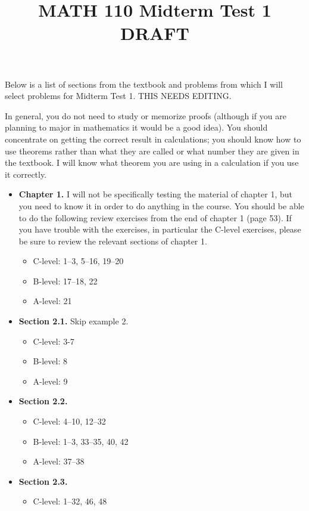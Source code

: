 \documentclass[11pt]{article}
\title{MATH 110 Midterm Test 1 DRAFT}
\author{\commonAuthor}
\date{\commonDateMTOne}
\begin{document}
\maketitle

Below is a list of sections from the textbook
and problems from which I will select problems for
Midterm Test 1.  THIS NEEDS EDITING.

In general, you do not need to study or memorize proofs (although if
you are planning to major in mathematics it would be a good idea).
You should concentrate on getting the correct result in calculations;
you should know how to use theorems rather than what they are called
or what number they are given in the textbook.  I will know what
theorem you are using in a calculation if you use it correctly.

\begin{itemize}
\item \textbf{Chapter 1.}
  I will not be specifically testing the material of chapter 1, but you
  need to know it in order to do anything in the course.
  You should be able to do the following review exercises from the end
  of chapter 1 (page 53).  If you
  have trouble with the exercises, in particular the C-level exercises,
  please be sure to review the relevant sections of chapter 1.
  \begin{itemize}
  \item C-level: 1--3, 5--16, 19--20
  \item B-level: 17--18, 22
  \item A-level: 21
  \end{itemize}
\item \textbf{Section 2.1.} Skip example 2.
  \begin{itemize}
  \item C-level: 3-7
  \item B-level: 8
  \item A-level: 9
  \end{itemize}
\item \textbf{Section 2.2.}
  \begin{itemize}
  \item C-level: 4--10, 12--32
  \item B-level: 1--3, 33--35, 40, 42
  \item A-level: 37--38
  \end{itemize}
\item \textbf{Section 2.3.}
  \begin{itemize}
  \item C-level: 1--32, 46, 48

\end{itemize}
\end{itemize}
\end{document}

